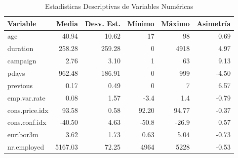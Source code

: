 \documentclass[10pt]{article}
\begin{document}
\begin{table}[h!]
\centering
\caption{Estadísticas Descriptivas de Variables Numéricas}
\label{tab:estadisticas_numericas}
\begin{tabular}{lrrrrr}
\hline
\textbf{Variable} & \textbf{Media} & \textbf{Desv. Est.} & \textbf{Mínimo} & \textbf{Máximo} & \textbf{Asimetría} \\
\hline
age & 40.94 & 10.62 & 17 & 98 & 0.69 \\
duration & 258.28 & 259.28 & 0 & 4918 & 4.97 \\
campaign & 2.76 & 3.10 & 1 & 63 & 9.13 \\
pdays & 962.48 & 186.91 & 0 & 999 & -4.50 \\
previous & 0.17 & 0.49 & 0 & 7 & 6.57 \\
emp.var.rate & 0.08 & 1.57 & -3.4 & 1.4 & -0.79 \\
cons.price.idx & 93.58 & 0.58 & 92.20 & 94.77 & -0.37 \\
cons.conf.idx & -40.50 & 4.63 & -50.8 & -26.9 & 0.57 \\
euribor3m & 3.62 & 1.73 & 0.63 & 5.04 & -0.73 \\
nr.employed & 5167.03 & 72.25 & 4964 & 5228 & -0.53 \\
\hline
\end{tabular}
\end{table}
\end{document}
